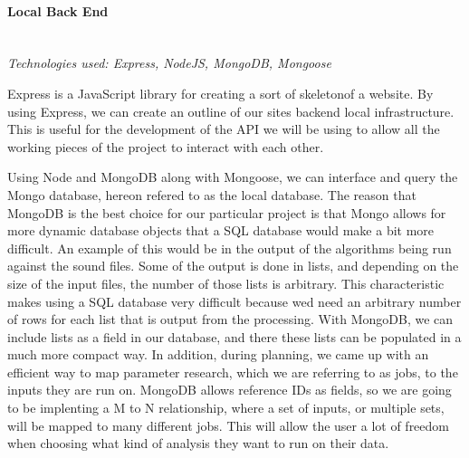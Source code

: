 \paragraph{Local Back End} \mbox{} \\
\textit{Technologies used: Express, NodeJS, MongoDB, Mongoose}\par
Express is a JavaScript library for creating a sort of \textquotesingle skeleton\textquotesingle of a website. By using Express, we can create an outline of our site\textquotesingle s backend local infrastructure. This is useful for the development of the API we will be using to allow all the working pieces of the project to interact with each other.\par
Using Node and MongoDB along with Mongoose, we can interface and query the Mongo database, hereon refered to as the local database. The reason that MongoDB is the best choice for our particular project is that Mongo allows for more dynamic database objects that a SQL database would make a bit more difficult. An example of this would be in the output of the algorithms being run against the sound files. Some of the output is done in lists, and depending on the size of the input files, the number of those lists is arbitrary. This characteristic makes using a SQL database very difficult because we\textquotesingle d need an arbitrary number of rows for each list that is output from the processing. With MongoDB, we can include lists as a field in our database, and there these lists can be populated in a much more compact way. In addition, during planning, we came up with an efficient way to map parameter research, which we are referring to as jobs, to the inputs they are run on. MongoDB allows reference IDs as fields, so we are going to be implenting a M to N relationship, where a set of inputs, or multiple sets, will be mapped to many different jobs. This will allow the user a lot of freedom when choosing what kind of analysis they want to run on their data.\par

